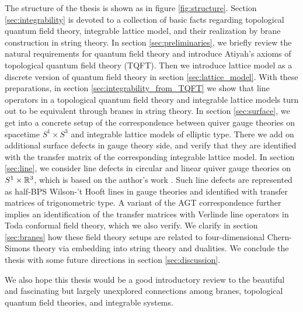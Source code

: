 The structure of the thesis is shown as in figure \ref{fig:structure}.
Section \ref{sec:integrability} is devoted to a collection of basic facts regarding
topological quantum field theory, integrable lattice model, and
their realization by brane construction in string theory.
In section \ref{sec:preliminaries}, we briefly review the natural requirements for quantum field theory
and introduce Atiyah's axioms of topological quantum field theory (TQFT). Then we introduce lattice model as
a discrete version of quantum field theory in section \ref{sec:lattice_model}.
With these preparations, in section \ref{sec:integrability_from_TQFT}
we show that line operators in a topological quantum field theory and
integrable lattice models turn out to be equivalent through branes in string theory.
In section \ref{sec:surface}, we get into a concrete setup of the correspondence
between quiver gauge theories on spacetime $S^1\times S^3$ and
integrable lattice models of elliptic type.
There we add on additional surface defects in gauge theory side, and verify that they are
identified with the transfer matrix of the corresponding integrable lattice model.
In section \ref{sec:line}, we consider line defects in circular and linear quiver gauge
theories on $S^1\times \mathbb{R}^3$, which is based on the author's work \cite{Maruyoshi:2020cwy}.
Such line defects are represented as half-BPS Wilson-'t Hooft lines in gauge theories and
identified with transfer matrices of trigonometric type.
A variant of the AGT correspondence further implies an identification of the transfer matrices with
Verlinde line operators in Toda conformal field theory, which we also verify.
We clarify in section \ref{sec:branes} how these field theory setups are
related to four-dimensional Chern-Simons theory via embedding into string theory and dualities.
We conclude the thesis with some future directions in section \ref{sec:discussion}.


We also hope this thesis would be a good introductory review to the beautiful
and fascinating but largely unexplored connections among branes, topological
quantum field theories, and integrable systems.



















